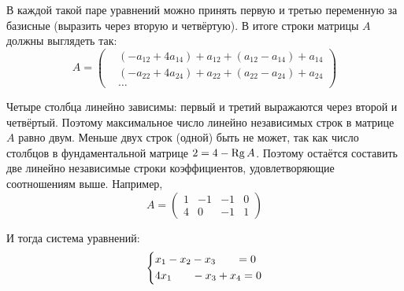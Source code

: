 \documentclass[a4paper,12pt]{article}
\begin{document}
\begin{solution}
    В каждой такой паре уравнений можно принять первую и третью переменную за базисные (выразить через вторую и четвёртую).
    В итоге строки матрицы $A$ должны выглядеть так:
    \[
      A = \begin{pmatrix}
        &(-a_{12} + 4 a_{14}) + a_{12} + (a_{12} - a_{14}) + a_{14}\\
        &(-a_{22} + 4 a_{24}) + a_{22} + (a_{22} - a_{24}) + a_{24}\\
        &\ldots
      \end{pmatrix}
    \]
    
    Четыре столбца линейно зависимы: первый и третий выражаются через второй и четвёртый.
    Поэтому максимальное число линейно независимых строк в матрице $A$ равно двум.
    Меньше двух строк (одной) быть не может, так как число столбцов в фундаментальной матрице $2 \hm= 4 \hm- \Rg A$.
    Поэтому остаётся составить две линейно независимые строки коэффициентов, удовлетворяющие соотношениям выше.
    Например,
    \[
      A = \begin{pmatrix}
        1 & -1 & -1 & 0\\
        4 & 0 & -1 & 1
      \end{pmatrix}
    \]
    
    И тогда система уравнений:
    \[
      \left\{
        \begin{aligned}
          &x_1 - x_2 - x_3 \hphantom{+ x_4} = 0\\
          &4x_1 \hphantom{+ x_2} - x_3 + x_4 = 0
        \end{aligned}
      \right.
    \]
  \end{solution}
\end{document}
